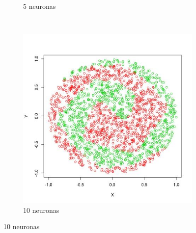 \documentclass[12pt, a4paper]{article}
\begin{document}
\begin{figure}
\begin{subfigure}[b]{0.4\textwidth}
        \caption{5 neuronas}
    \end{subfigure}
    ~ %
    \begin{subfigure}[b]{0.4\textwidth}
        \includegraphics[width=\textwidth]{prediccion3}
        \caption{10 neuronas}
    \end{subfigure}
    

\end{figure}
\end{document}
